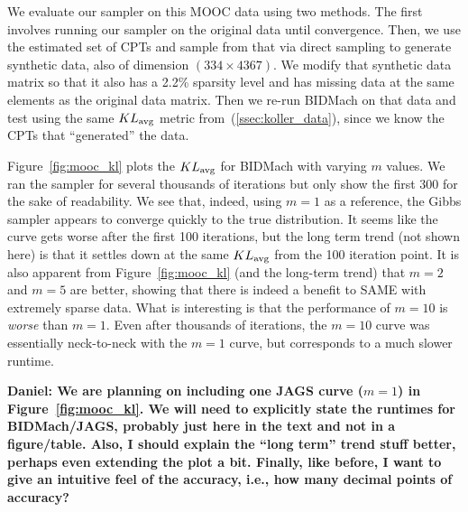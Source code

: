 \documentclass{article} %
\begin{document}
We evaluate our sampler on this MOOC data using two methods. The first involves running our sampler
on the original data until convergence. Then, we use the estimated set of CPTs and sample from that
via direct sampling to generate synthetic data, also of dimension $(334 \times 4367)$. We modify
that synthetic data matrix so that it also has a 2.2\% sparsity level and has missing data at the
same elements as the original data matrix. Then we re-run BIDMach on that data and test using the
same $KL_{\rm avg}$ metric from~(\ref{ssec:koller_data}), since we know the CPTs that ``generated''
the data.

Figure~\ref{fig:mooc_kl} plots the $KL_{\rm avg}$ for BIDMach with varying $m$ values. We ran the
sampler for several thousands of iterations but only show the first 300 for the sake of readability.
We see that, indeed, using $m=1$ as a reference, the Gibbs sampler appears to converge quickly to
the true distribution. It seems like the curve gets worse after the first 100 iterations, but
the long term trend (not shown here) is that it settles down at the same $KL_{\rm avg}$ from the 100
iteration point. It is also apparent from Figure~\ref{fig:mooc_kl} (and the long-term trend) that
$m=2$ and $m=5$ are better, showing that there is indeed a benefit to SAME with extremely sparse
data. What is interesting is that the performance of $m=10$ is \emph{worse} than $m=1$. Even after
thousands of iterations, the $m=10$ curve was essentially neck-to-neck with the $m=1$ curve, but
corresponds to a much slower runtime.

\textbf{Daniel: We are planning on including one JAGS curve ($m=1$) in Figure~\ref{fig:mooc_kl}. We
will need to explicitly state the runtimes for BIDMach/JAGS, probably just here in the text and not
in a figure/table. Also, I should explain the ``long term'' trend stuff better, perhaps even
extending the plot a bit. Finally, like before, I want to give an intuitive feel of the accuracy,
i.e., how many decimal points of accuracy?}
\end{document}
